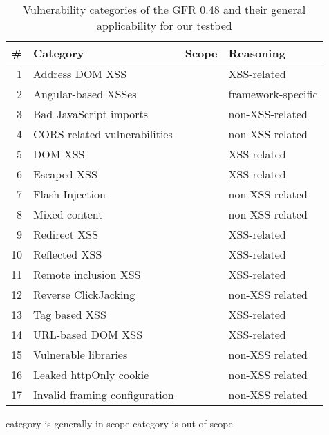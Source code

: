 \newcommand{\inscope}[0]{\textcolor{OliveGreen}{\ding{51}}}
\newcommand{\noscope}[0]{\textcolor{BrickRed}{\ding{55}}}

\begin{table}[htb]
	\centering
	\tablesize
	\begin{threeparttable}
		\caption{Vulnerability categories of the GFR 0.48 and their general applicability for our \blindxss{} testbed}\label{tab:appendix:gfr-categories}
		\begin{tabularx}{\linewidth}{rXcl}
			\toprule
			\textbf{\#} & \textbf{Category} & \textbf{Scope} & \textbf{Reasoning} \\
            \midrule
            1 & Address DOM XSS & \inscope & XSS-related \\
            2 & Angular-based XSSes & \noscope & framework-specific \\
            3 & Bad JavaScript imports & \noscope & non-XSS-related \\
            4 & CORS related vulnerabilities & \noscope & non-XSS-related \\
            5 & DOM XSS & \inscope & XSS-related \\
            6 & Escaped XSS & \inscope & XSS-related \\
            7 & Flash Injection & \noscope &  non-XSS related \\
            8 & Mixed content & \noscope & non-XSS related \\
            9 & Redirect XSS & \inscope & XSS-related \\ 
            10 & Reflected XSS & \inscope & XSS-related \\
            11 & Remote inclusion XSS & \inscope & XSS-related \\
            12 & Reverse ClickJacking & \noscope & non-XSS related \\
            13 & Tag based XSS & \inscope & XSS-related \\
            14 & URL-based DOM XSS & \inscope & XSS-related \\
            15 & Vulnerable libraries & \noscope & non-XSS related \\
            16 & Leaked httpOnly cookie & \noscope & non-XSS related \\
            17 & Invalid framing configuration & \noscope & non-XSS related \\
            \bottomrule
		\end{tabularx}
		\begin{tablenotes}
			\item \inscope{} category is generally in scope\hspace{2em}\noscope{} category is out of scope
		\end{tablenotes}
	\end{threeparttable}%
\end{table}
